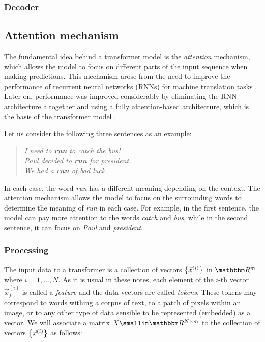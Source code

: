 \subsubsection{Decoder}\label{subsubsec:decoder}

\subsection{Attention mechanism}\label{subsec:attention_mechanism}

The fundamental idea behind a transformer model is the \emph{attention} mechanism, which allows the model to focus on different parts of the input sequence when making predictions. This mechanism arose from the need to improve the performance of recurrent neural networks (RNNs) for machine translation tasks \cite{bahdanauNeuralMachineTranslation2016}. Later on, performance was improved considerably by eliminating the RNN architecture altogether and using a fully attention-based architecture, which is the basis of the transformer model \cite{vaswaniAttentionAllYou2017}. 


Let us consider the following three sentences as an example:

\begin{quote}
    \textit{I need to \textbf{run} to catch the bus!}  \\
    \textit{Paul decided to \textbf{run} for president.} \\
    \textit{We had a \textbf{run} of bad luck.} 
\end{quote}

In each case, the word \textit{run} has a different meaning depending on the context. The attention mechanism allows the model to focus on the surrounding words to determine the meaning of \textit{run} in each case. For example, in the first sentence, the model can pay more attention to the words \textit{catch} and \textit{bus}, while in the second sentence, it can focus on \textit{Paul} and \textit{president}.

\subsubsection{Processing}\label{subsubsec:processing}

The input data to a transformer is a collection of vectors $\left\lbrace \vec{x}^{(i)} \right\rbrace$ in $\RR^m$ where ${i=1,...,N}$. As it is usual in these notes, each element of the $i$-th vector $\vec{x}^{(i)}_j$ is called a \emph{feature} and the data vectors are called \emph{tokens}. These tokens may correspond to words withing a corpus of text, to a patch of pixels within an image, or to any other type of data sensible to be represented (embedded) as a vector. We will associate a matrix $X \in \RR^{N \times m}$ to the collection of vectors $\left\lbrace \vec{x}^{(i)} \right\rbrace$ as follows: 

